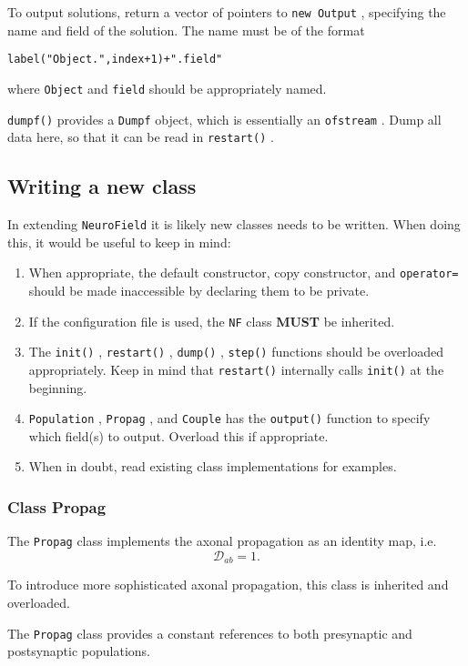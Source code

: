 \documentclass[12pt,a4paper]{article}
\newcommand{\type}[1]{ {\small\small\tt #1} }
\begin{document}
To output solutions, return a vector of pointers to \type{new Output}, specifying the name and field of the solution. The name must be of the format
\begin{lstlisting}
label("Object.",index+1)+".field"
\end{lstlisting}
where \type{Object} and \type{field} should be appropriately named.

\type{dumpf()} provides a \type{Dumpf} object, which is essentially an \type{ofstream}. Dump all data here, so that it can be read in \type{restart()}.

\subsection{Writing a new class}

In extending \type{NeuroField} it is likely new classes needs to be written. When doing this, it would be useful to keep in mind:
\begin{enumerate}
	\item When appropriate, the default constructor, copy constructor, and \type{operator=} should be made inaccessible by declaring them to be private.
	\item If the configuration file is used, the \type{NF} class \textbf{MUST} be inherited.
	\item The \type{init()}, \type{restart()}, \type{dump()}, \type{step()} functions should be overloaded appropriately. Keep in mind that \type{restart()} internally calls \type{init()} at the beginning.
	\item \type{Population}, \type{Propag}, and \type{Couple} has the \type{output()} function to specify which field(s) to output. Overload this if appropriate.
	\item When in doubt, read existing class implementations for examples.
\end{enumerate}

\subsubsection{Class Propag}
\label{sec:newpropag}

The \type{Propag} class implements the axonal propagation as an identity map, i.e.
\[ \mathcal{D}_{ab} = 1. \]

To introduce more sophisticated axonal propagation, this class is inherited and overloaded.

The \type{Propag} class provides a constant references to both presynaptic and postsynaptic populations.
\end{document}

